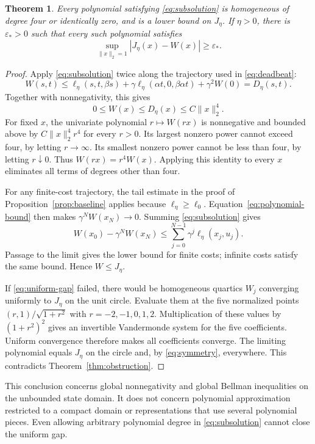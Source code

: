 \documentclass[10pt]{article}
\newtheorem{theorem}{Theorem}
\begin{document}
\begin{theorem}
\label{thm:degree}
Every polynomial satisfying \eqref{eq:subsolution} is homogeneous of degree four or identically zero, and is a lower bound on $J_\eta$. If $\eta>0$, there is $\varepsilon_*>0$ such that every such polynomial satisfies
\begin{equation}
 \sup_{\|x\|_2=1}|J_\eta(x)-W(x)|\geq\varepsilon_*.
 \label{eq:uniform-gap}
\end{equation}
\end{theorem}
\begin{proof}
Apply \eqref{eq:subsolution} twice along the trajectory used in \eqref{eq:deadbeat}:
\[
 W(s,t)\leq\ell_\eta(s,t,\beta s)
       +\gamma\ell_\eta(\alpha t,0,\beta\alpha t)+\gamma^2W(0)
       =D_\eta(s,t).
\]
Together with nonnegativity, this gives
\begin{equation}
 0\leq W(x)\leq D_\eta(x)\leq C\|x\|_2^4.
 \label{eq:polynomial-bound}
\end{equation}
For fixed $x$, the univariate polynomial $r\mapsto W(rx)$ is nonnegative and bounded above by $C\|x\|_2^4r^4$ for every $r>0$. Its largest nonzero power cannot exceed four, by letting $r\to\infty$. Its smallest nonzero power cannot be less than four, by letting $r\downarrow0$. Thus $W(rx)=r^4W(x)$. Applying this identity to every $x$ eliminates all terms of degrees other than four.

For any finite-cost trajectory, the tail estimate in the proof of Proposition~\ref{prop:baseline} applies because $\ell_\eta\geq\ell_0$. Equation~\eqref{eq:polynomial-bound} then makes $\gamma^NW(x_N)\to0$. Summing \eqref{eq:subsolution} gives
\[
 W(x_0)-\gamma^NW(x_N)\leq
 \sum_{j=0}^{N-1}\gamma^j\ell_\eta(x_j,u_j).
\]
Passage to the limit gives the lower bound for finite costs; infinite costs satisfy the same bound. Hence $W\leq J_\eta$.

If \eqref{eq:uniform-gap} failed, there would be homogeneous quartics $W_j$ converging uniformly to $J_\eta$ on the unit circle. Evaluate them at the five normalized points $(r,1)/\sqrt{1+r^2}$ with $r=-2,-1,0,1,2$. Multiplication of these values by $(1+r^2)^2$ gives an invertible Vandermonde system for the five coefficients. Uniform convergence therefore makes all coefficients converge. The limiting polynomial equals $J_\eta$ on the circle and, by \eqref{eq:symmetry}, everywhere. This contradicts Theorem~\ref{thm:obstruction}.
\end{proof}

This conclusion concerns global nonnegativity and global Bellman inequalities on the unbounded state domain. It does not concern polynomial approximation restricted to a compact domain or representations that use several polynomial pieces. Even allowing arbitrary polynomial degree in \eqref{eq:subsolution} cannot close the uniform gap.
\end{document}
